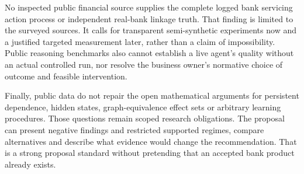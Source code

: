 No inspected public financial source supplies the complete logged bank
servicing action process or independent real-bank linkage truth. That
finding is limited to the surveyed sources. It calls for transparent
semi-synthetic experiments now and a justified targeted measurement
later, rather than a claim of impossibility. Public reasoning benchmarks
also cannot establish a live agent's quality without an actual
controlled run, nor resolve the business owner's normative choice of
outcome and feasible intervention.

Finally, public data do not repair the open mathematical arguments for
persistent dependence, hidden states, graph-equivalence effect sets or
arbitrary learning procedures. Those questions remain scoped research
obligations. The proposal can present negative findings and restricted
supported regimes, compare alternatives and describe what evidence would
change the recommendation. That is a strong proposal standard without
pretending that an accepted bank product already exists.
